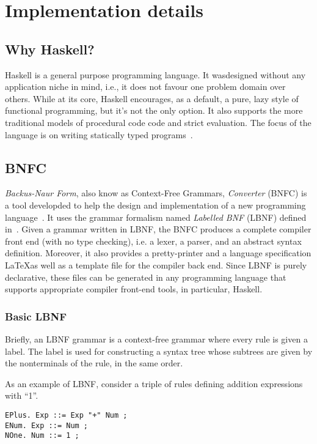 \chapter{Implementation details}

\section{Why Haskell?}

Haskell is a general purpose programming language. It wasdesigned without any
application niche in mind, i.e., it does not favour one problem domain over
others. While at its core, Haskell encourages, as a default, a pure, lazy style of
functional programming, but it's not the only option. It also supports the more
traditional models of procedural code code and strict evaluation. The focus of
the language is on writing statically typed programs~\cite{rwhaskell}. 

\section{BNFC}
\textit{Backus-Naur Form}, also know as Context-Free Grammars,
\textit{Converter} (BNFC) is a tool developded to help the design and
implementation of a new programming language~\cite{bnfcsite}. 
It uses the grammar formalism named \textit{Labelled BNF} (LBNF) defined
in~\cite{bnfc}. Given a grammar written in LBNF, the BNFC produces a complete
compiler front end (with no type checking), i.e. a lexer, a parser, and an
abstract syntax definition. Moreover, it also provides a pretty-printer and a
language specification \LaTeX as well as a template file for the compiler back
end. Since LBNF is purely declarative, these files can be generated in any
programming language that supports appropriate compiler front-end tools, in
particular, Haskell.

\subsection{Basic LBNF}

Briefly, an LBNF grammar is a context-free grammar where every rule is given a
label. The label is used for constructing a syntax tree whose subtrees are given
by the nonterminals of the rule, in the same order.

As an example of LBNF, consider a triple of rules defining addition expressions
with ``1''.

\begin{verbatim}
EPlus. Exp ::= Exp "+" Num ;
ENum. Exp ::= Num ;
NOne. Num ::= 1 ;
\end{verbatim}

